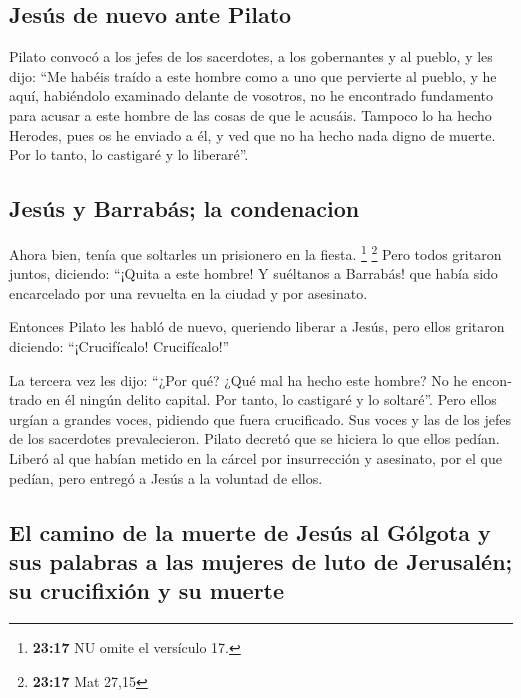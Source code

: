 \begin{paracol}{2}
\begin{otherlanguage}{english}
\hypertarget{jesuxfas-de-nuevo-ante-pilato}{%
\subsection{Jesús de nuevo ante
Pilato}\label{jesuxfas-de-nuevo-ante-pilato}}

 Pilato convocó a los jefes de los sacerdotes, a los
gobernantes y al pueblo,  y les dijo: ``Me habéis traído
a este hombre como a uno que pervierte al pueblo, y he aquí, habiéndolo
examinado delante de vosotros, no he encontrado fundamento para acusar a
este hombre de las cosas de que le acusáis.  Tampoco lo
ha hecho Herodes, pues os he enviado a él, y ved que no ha hecho nada
digno de muerte.  Por lo tanto, lo castigaré y lo
liberaré''.

\hypertarget{jesuxfas-y-barrabuxe1s-la-condenacion}{%
\subsection{Jesús y Barrabás; la
condenacion}\label{jesuxfas-y-barrabuxe1s-la-condenacion}}

 Ahora bien, tenía que soltarles un prisionero en la
fiesta. \footnote{\textbf{23:17} NU omite el versículo 17.} \footnote{\textbf{23:17}
  Mat 27,15}  Pero todos gritaron juntos, diciendo:
``¡Quita a este hombre! Y suéltanos a Barrabás!  que
había sido encarcelado por una revuelta en la ciudad y por asesinato.

 Entonces Pilato les habló de nuevo, queriendo liberar a
Jesús,  pero ellos gritaron diciendo: ``¡Crucifícalo!
Crucifícalo!''

 La tercera vez les dijo: ``¿Por qué? ¿Qué mal ha hecho
este hombre? No he encontrado en él ningún delito capital. Por tanto, lo
castigaré y lo soltaré''.  Pero ellos urgían a grandes
voces, pidiendo que fuera crucificado. Sus voces y las de los jefes de
los sacerdotes prevalecieron.  Pilato decretó que se
hiciera lo que ellos pedían.  Liberó al que habían metido
en la cárcel por insurrección y asesinato, por el que pedían, pero
entregó a Jesús a la voluntad de ellos.

\hypertarget{el-camino-de-la-muerte-de-jesuxfas-al-guxf3lgota-y-sus-palabras-a-las-mujeres-de-luto-de-jerusaluxe9n-su-crucifixiuxf3n-y-su-muerte}{%
\subsection{El camino de la muerte de Jesús al Gólgota y sus palabras a
las mujeres de luto de Jerusalén; su crucifixión y su
muerte}\label{el-camino-de-la-muerte-de-jesuxfas-al-guxf3lgota-y-sus-palabras-a-las-mujeres-de-luto-de-jerusaluxe9n-su-crucifixiuxf3n-y-su-muerte}}


\end{otherlanguage}
\end{paracol}
